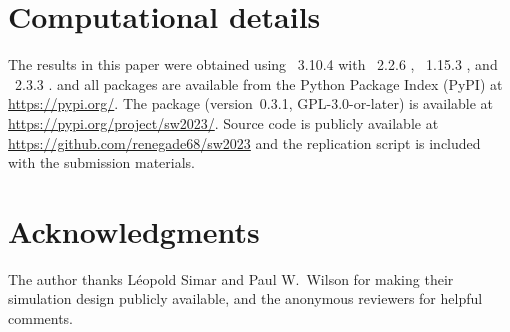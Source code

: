 \documentclass[article]{jss}
\begin{document}

\section*{Computational details}

The results in this paper were obtained using ~3.10.4
with ~2.2.6 \citep{HarrisEtAl2020},
~1.15.3 \citep{VirtanenEtAl2020}, and
~2.3.3 \citep{McKinney2010}.
 and all packages are available from the
Python Package Index (PyPI) at \url{https://pypi.org/}.
The  package (version~0.3.1, GPL-3.0-or-later) is available at
\url{https://pypi.org/project/sw2023/}.
Source code is publicly available at
\url{https://github.com/renegade68/sw2023} and the replication script
 is included with the submission materials.



\section*{Acknowledgments}

The author thanks Léopold Simar and Paul W.\ Wilson for making their
simulation design publicly available, and the anonymous reviewers for
helpful comments.




\end{document}
